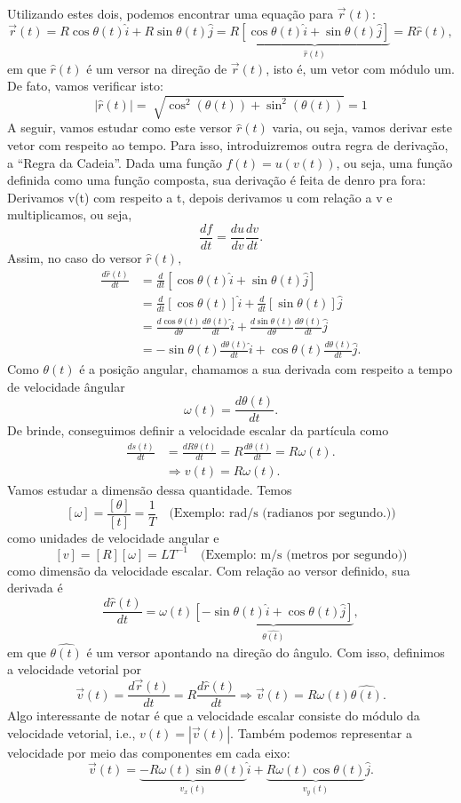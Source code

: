 \documentclass[PhysicsI/physics_notes.tex]{subfiles}
\begin{document}
Utilizando estes dois, podemos encontrar uma equação para $\vec{r}(t)$:
$$
	\vec{r}(t) = R\cos{\theta(t)}\hat{i} + R\sin{\theta(t)}\hat{j} = R\underbrace{[\cos{\theta(t)}\hat{i} + \sin{\theta(t)}\hat{j}]}_{\hat{r}(t)}
	= R\hat{r}(t),
$$
em que $\hat{r}(t)$ é um versor na direção de $\vec{r}(t)$, isto é, um vetor com módulo um. De fato, vamos verificar isto:
$$
	|\hat{r}(t)| = \sqrt[]{\cos^{2}(\theta(t)) + \sin^{2}(\theta(t))} = 1
$$
A seguir, vamos estudar como este versor $\hat{r}(t)$ varia, ou seja, vamos derivar este vetor com respeito ao tempo. Para isso,
introduizremos outra regra de derivação, a ``Regra da Cadeia''. Dada uma função $f(t) = u(v(t))$, ou seja, uma função
definida como uma função composta, sua derivação é feita de denro pra fora: Derivamos v(t) com respeito a t, depois derivamos
u com relação a v e multiplicamos, ou seja,
$$
	\boxed{\frac{df}{dt} = \frac{du}{dv}\frac{dv}{dt}}.
$$
Assim, no caso do versor $\hat{r}(t),$
\begin{align*}
	\frac{d\hat{r}(t)}{dt} & = \frac{d}{dt}[\cos{\theta(t)}\hat{i} + \sin{\theta(t)}\hat{j}]                                                               \\
	                       & = \frac{d}{dt}[\cos{\theta(t)}]\hat{i} + \frac{d}{dt}[\sin{\theta(t)}]\hat{j}                                                 \\
	                       & = \frac{d\cos{\theta(t)}}{d\theta}\frac{d\theta(t)}{dt}\hat{i} + \frac{d\sin{\theta(t)}}{d\theta}\frac{d\theta(t)}{dt}\hat{j} \\
	                       & = -\sin{\theta(t)}\frac{d\theta(t)}{dt}\hat{i} + \cos{\theta(t)}\frac{d\theta(t)}{dt}\hat{j}.
\end{align*}
Como $\theta(t)$ é a posição angular, chamamos a sua derivada com respeito a tempo de velocidade ângular
$$
	\boxed{\omega(t) = \frac{d\theta(t)}{dt}.}
$$
De brinde, conseguimos definir a velocidade escalar da partícula como
\begin{align*}
	\frac{ds(t)}{dt} & = \frac{dR\theta(t)}{dt} = R \frac{d\theta(t)}{dt} = R\omega(t). \\
	                 & \Rightarrow \boxed{v(t) = R\omega(t).}
\end{align*}
Vamos estudar a dimensão dessa quantidade. Temos
$$
	[\omega] = \frac{[\theta]}{[t]} = \frac{1}{T} \quad \text{(Exemplo: rad/s (radianos por segundo.))}
$$
como unidades de velocidade angular e
$$
	[v] = [R][\omega] = LT^{-1} \quad \text{(Exemplo: m/s (metros por segundo))}
$$
como dimensão da velocidade escalar. Com relação ao versor definido, sua derivada é
$$
	\frac{d\hat{r}(t)}{dt} = \omega(t)\underbrace{[-\sin{\theta(t)}\hat{i}+\cos{\theta(t)}\hat{j}]}_{\hat{\theta(t)}},
$$
em que $\hat{\theta(t)}$ é um versor apontando na direção do ângulo. Com isso, definimos a velocidade vetorial por
$$
	\vec{v}(t) = \frac{d \vec{r}(t)}{dt} = R \frac{d\hat{r}(t)}{dt} \Rightarrow \vec{v}(t) = R\omega(t)\hat{\theta(t)}.
$$
Algo interessante de notar é que a velocidade escalar consiste do módulo da velocidade vetorial, i.e., $v(t) = |\vec{v}(t)|.$
Também podemos representar a velocidade por meio das componentes em cada eixo:
$$
	\vec{v}(t) = \underbrace{-R\omega(t)\sin{\theta(t)}}_{v_{x}(t)}\hat{i} + \underbrace{R\omega(t)\cos{\theta(t)}}_{v_{y}(t)}\hat{j}.
$$
\end{document}
